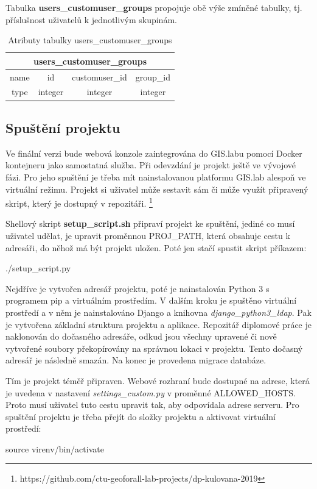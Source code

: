 Tabulka \textbf{users\_customuser\_groups} propojuje obě výše zmíněné
tabulky, tj. příslušnost uživatelů k jednotlivým skupinám.

\begin{table}[H]
\centering
\begin{tabular}{@{}|c|c|c|c|@{}}
\toprule
\multicolumn{4}{|c|}{users\_customuser\_groups} \\ \midrule
name & id & customuser\_id & group\_id \\ \midrule
type & integer & integer & integer \\ \bottomrule
\end{tabular}
\caption{Atributy tabulky users\_customuser\_groups}
\label{tab:users-customuser-groups}
\end{table}

\subsection{Spuštění projektu}
Ve finální verzi bude webová konzole zaintegrována do GIS.labu pomocí
Docker kontejneru jako samostatná služba. Při odevzdání je projekt
ještě ve vývojové fázi. Pro jeho spuštění je třeba mít nainstalovanou
platformu GIS.lab alespoň ve virtuální režimu. Projekt si uživatel
může sestavit sám či může využít připravený skript, který je dostupný
v
repozitáři. \footnote{https://github.com/ctu-geoforall-lab-projects/dp-kulovana-2019}

Shellový skript \textbf{setup\_script.sh} připraví projekt ke
spuštění, jediné co musí uživatel udělat, je upravit proměnnou
\textsf{PROJ\_PATH}, která obsahuje cestu k adresáři, do něhož má být
projekt uložen. Poté jen stačí spustit skript příkazem:
\begin{center}
\textsf{./setup\_script.py}
\end{center}
Nejdříve je vytvořen adresář projektu, poté je nainstalován Python 3 s
programem pip a virtuálním prostředím. V dalším kroku je spuštěno
virtuální prostředí a v něm je nainstalováno Django a knihovna
\textit{django\_python3\_ldap}. Pak je vytvořena základní struktura
projektu a aplikace. Repozitář diplomové práce je naklonován do
dočasného adresáře, odkud jsou všechny upravené či nově vytvořené
soubory překopírovány na správnou lokaci v projektu. Tento dočasný
adresář je následně smazán. Na konec je provedena migrace databáze.

Tím je projekt téměř připraven. Webové rozhraní bude dostupné na
adrese, která je uvedena v nastavení \textit{settings\_custom.py} v
proměnné \textsf{ALLOWED\_HOSTS}. Proto musí uživatel tuto cestu
upravit tak, aby odpovídala adrese serveru. Pro spuštění projektu je
třeba přejít do složky projektu a aktivovat virtuální prostředí:
\begin{center}
\textsf{source virenv/bin/activate}
\end{center}

